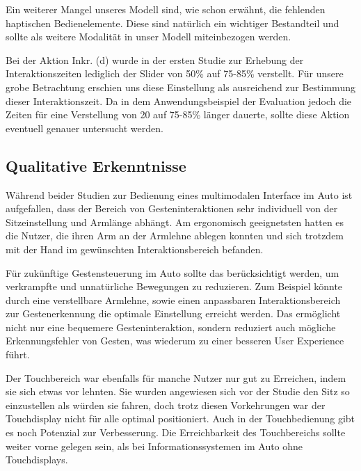 Ein weiterer Mangel unseres Modell sind, wie schon erwähnt, die fehlenden haptischen Bedienelemente. Diese sind natürlich ein wichtiger Bestandteil und sollte als weitere Modalität in unser Modell miteinbezogen werden. 

Bei der Aktion Inkr. (d) wurde in der ersten Studie zur Erhebung der Interaktionszeiten lediglich der Slider von 50\% auf 75-85\% verstellt. Für unsere grobe Betrachtung erschien uns diese Einstellung als ausreichend zur Bestimmung dieser Interaktionszeit. Da in dem Anwendungsbeispiel der Evaluation jedoch die Zeiten für eine Verstellung von 20 auf 75-85\% länger dauerte, sollte diese Aktion eventuell genauer untersucht werden. 

\subsection[Qualitative Erkenntnisse]{Qualitative Erkenntnisse}
Während beider Studien zur Bedienung eines multimodalen Interface im Auto ist aufgefallen, dass der Bereich von Gesteninteraktionen sehr individuell von der Sitzeinstellung und Armlänge abhängt. Am ergonomisch geeignetsten hatten es die Nutzer, die ihren Arm an der Armlehne ablegen konnten und sich trotzdem mit der Hand im gewünschten Interaktionsbereich befanden. 

Für zukünftige Gestensteuerung im Auto sollte das berücksichtigt werden, um verkrampfte und unnatürliche Bewegungen zu reduzieren. Zum Beispiel könnte durch eine verstellbare Armlehne, sowie einen anpassbaren Interaktionsbereich zur Gestenerkennung die optimale Einstellung erreicht werden. Das ermöglicht nicht nur eine bequemere Gesteninteraktion, sondern reduziert auch mögliche Erkennungsfehler von Gesten, was wiederum zu einer besseren User Experience führt.

Der Touchbereich war ebenfalls für manche Nutzer nur gut zu Erreichen, indem sie sich etwas vor lehnten. Sie  wurden angewiesen sich vor der Studie den Sitz so einzustellen als würden sie fahren, doch trotz diesen Vorkehrungen war der Touchdisplay nicht für alle optimal positioniert. Auch in der Touchbedienung gibt es noch Potenzial zur Verbesserung. Die Erreichbarkeit des Touchbereichs sollte weiter vorne gelegen sein, als bei Informationssystemen im Auto ohne Touchdisplays.